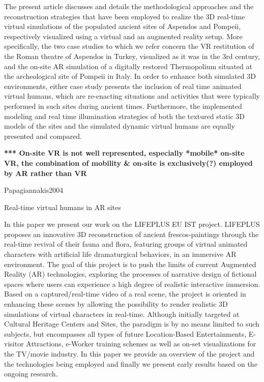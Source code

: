 The present article discusses and details the methodological approaches and the reconstruction strategies that have been employed to realize the 3D real-time virtual simulations of the populated ancient sites of Aspendos and Pompeii, respectively visualized using a virtual and an augmented reality setup. More specifically, the two case studies to which we refer concern the VR restitution of the Roman theatre of Aspendos in Turkey, visualized as it was in the 3rd century, and the on-site AR simulation of a digitally restored Thermopolium situated at the archeological site of Pompeii in Italy. In order to enhance both simulated 3D environments, either case study presents the inclusion of real time animated virtual humans, which are re-enacting situations and activities that were typically performed in such sites during ancient times. Furthermore, the implemented modeling and real time illumination strategies of both the textured static 3D models of the sites and the simulated dynamic virtual humans are equally presented and compared.


\textbf{*** On-site VR is not well represented, especially *mobile* on-site VR, the combination of mobility \& on-site is exclusively(?) employed by AR rather than VR}


Papagiannakis2004

Real-time virtual humans in AR sites

In this paper we present our work on the LIFEPLUS EU IST project. LIFEPLUS proposes an innovative 3D reconstruction of ancient frescos-paintings through the real-time revival of their fauna and flora, featuring groups of virtual animated characters with artificial life dramaturgical behaviors, in an immersive AR environment. The goal of this project is to push the limits of current Augmented Reality (AR) technologies, exploring the processes of narrative design of fictional spaces where users can experience a high degree of realistic interactive immersion. Based on a captured/real-time video of a real scene, the project is oriented in enhancing these scenes by allowing the possibility to render realistic 3D simulations of virtual characters in real-time. Although initially targeted at Cultural Heritage Centers and Sites, the paradigm is by no means limited to such subjects, but encompasses all types of future Location-Based Entertainments, E- visitor Attractions, e-Worker training schemes as well as on-set visualizations for the TV/movie industry. In this paper we provide an overview of the project and the technologies being employed and finally we present early results based on the ongoing research.

